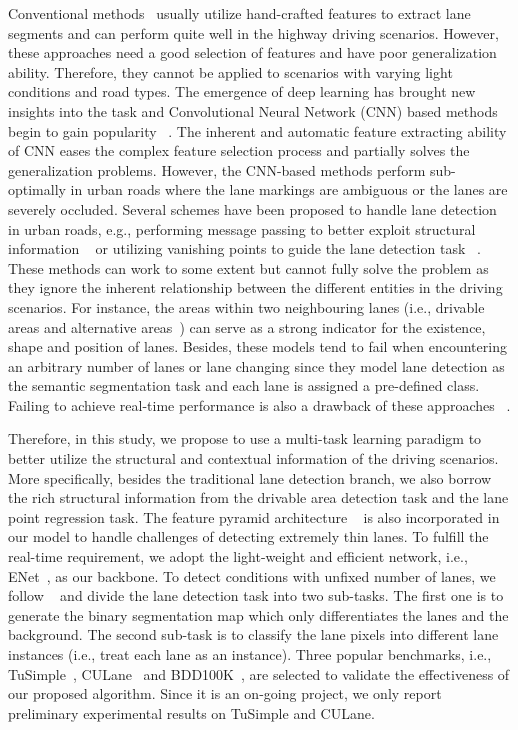 \documentclass[draftcls]{IEEEtran}
\begin{document}
Conventional methods~\cite{borkar2012novel, deusch2012random} usually utilize hand-crafted features to extract lane segments and can perform quite well in the highway driving scenarios. However, these approaches need a good selection of features and have poor generalization ability. Therefore, they cannot be applied to scenarios with varying light conditions and road types. The emergence of deep learning has brought new insights into the task and Convolutional Neural Network (CNN) based methods begin to gain popularity ~\cite{lee2017vpgnet, pan2017spatial, ghafoorian2018gan, chen2017rbnet, hou2018learning}. The inherent and automatic feature extracting ability of CNN eases the complex feature selection process and partially solves the generalization problems. However, the CNN-based methods perform sub-optimally in urban roads where the lane markings are ambiguous or the lanes are severely occluded. Several schemes have been proposed to handle lane detection in urban roads, e.g., performing message passing to better exploit structural information ~\cite{pan2017spatial} or utilizing vanishing points to guide the lane detection task ~\cite{lee2017vpgnet}. These methods can work to some extent but cannot fully solve the problem as they ignore the inherent relationship between the different entities in the driving scenarios. For instance, the areas within two neighbouring lanes (i.e., drivable areas and alternative areas~\cite{yu2018bdd100k}) can serve as a strong indicator for the existence, shape and position of lanes. Besides, these models tend to fail when encountering an arbitrary number of lanes or lane changing since they model lane detection as the semantic segmentation task and each lane is assigned a pre-defined class. Failing to achieve real-time performance is also a drawback of these approaches ~\cite{pan2017spatial, lee2017vpgnet}.  

Therefore, in this study, we propose to use a multi-task learning paradigm to better utilize the structural and contextual information of the driving scenarios. More specifically, besides the traditional lane detection branch, we also borrow the rich structural information from the drivable area detection task and the lane point regression task. The feature pyramid architecture ~\cite{lin2017feature} is also incorporated in our model to handle challenges of detecting extremely thin lanes. To fulfill the real-time requirement, we adopt the light-weight and efficient network, i.e.,  ENet~\cite{paszke2016enet}, as our backbone. To detect conditions with unfixed number of lanes, we follow ~\cite{neven2018towards} and divide the lane detection task into two sub-tasks. The first one is to generate the binary segmentation map which only differentiates the lanes and the background. The second sub-task is to classify the lane pixels into different lane instances (i.e., treat each lane as an instance). Three popular benchmarks, i.e., TuSimple~\cite{tusimple}, CULane~\cite{pan2017spatial} and BDD100K~\cite{yu2018bdd100k}, are selected to validate the effectiveness of our proposed algorithm. Since it is an on-going project, we only report preliminary experimental results on TuSimple and CULane.
\end{document}
